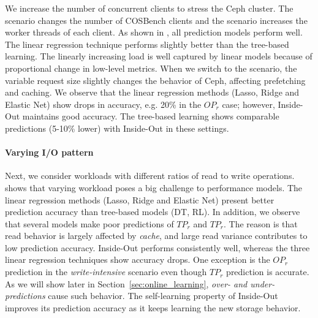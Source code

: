 We increase the number of concurrent clients to stress the Ceph cluster.
The \emph{\MakeLowercase{\scenarioMU}} scenario changes the number of COSBench clients and the \emph{\MakeLowercase{\scenarioCUB}} scenario increases the worker threads of each client.
As shown in \myfigure{\ref{fig:changing_workload}}, all prediction models perform well. The linear regression technique performs slightly better than the tree-based learning.
The linearly increasing load is well captured by linear models because of proportional change in low-level metrics.
When we switch to the \emph{\MakeLowercase{\scenarioCRB}} scenario, the variable request size slightly changes the behavior of Ceph, affecting prefetching and caching. 
We observe that the linear regression methods (Lasso, Ridge and Elastic Net) show drops in accuracy, e.g. 20\% in the $OP_r$ case; however, Inside-Out 
maintains good accuracy. 
The tree-based learning shows comparable predictions (5-10\% lower) with Inside-Out in these settings.





\paragraph*{Varying I/O pattern}

Next, we consider workloads with different ratios of read to write operations.
\myfigure{\ref{fig:changing_workload}} shows that varying workload poses a big challenge to performance models. 
The linear regression methods (Lasso, Ridge and Elastic Net) present better prediction accuracy than tree-based models (DT, RL).
In addition, we observe that several models make poor predictions of $TP_r$ and $TP_r$.
The reason is that read behavior is largely affected by \textit{cache}, and large read variance contributes to low prediction accuracy.
Inside-Out performs consistently well, whereas the three linear regression techniques show accuracy drops.
One exception is the $OP_r$ prediction in the \textit{write-intensive} scenario even though $TP_r$ prediction is accurate.
As we will show later in Section~\ref{sec:online_learning}, \emph{over- and under-predictions} cause such behavior. 
The self-learning property of Inside-Out improves its prediction accuracy as it keeps learning the new storage behavior.


